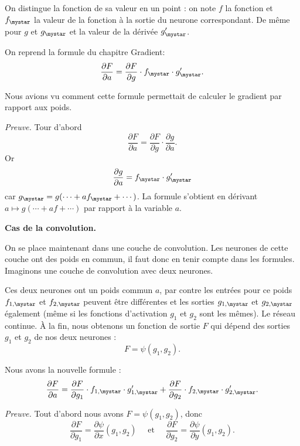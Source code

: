 \documentclass[11pt,class=report,crop=false]{standalone}
\begin{document}
On distingue la fonction de sa valeur en un point : on note $f$ la fonction et $f_\mystar$ la valeur de la fonction à la sortie du neurone correspondant. De même pour $g$ et $g_\mystar$ et la valeur de la dérivée $g'_\mystar$.



On reprend la formule du chapitre \og{}Gradient\fg{}:
$$\frac{\partial F}{\partial a} = \frac{\partial F}{\partial g} \cdot f_\mystar \cdot  g'_\mystar.$$

Nous avions vu comment cette formule permettait de calculer le gradient par rapport aux poids.


\emph{Preuve.}
Tour d'abord $$\frac{\partial F}{\partial a} =  \frac{\partial F}{\partial g} \cdot \frac{\partial g}{\partial a}.$$
Or 
$$\frac{\partial g}{\partial a} = f_\mystar \cdot g'_\mystar$$
car 
$g_\mystar = g(\cdots + a f_\mystar+\cdots)$. La formule s'obtient en dérivant $a \mapsto g(\cdots + a f +\cdots)$ par rapport à la variable $a$.

\textbf{Cas de la convolution.}

On se place maintenant dans une couche de convolution. Les neurones de cette couche ont des poids en commun, il faut donc en tenir compte dans les formules.
Imaginons une couche de convolution avec deux neurones.



Ces deux neurones ont un poids commun $a$, par contre les entrées pour ce poids 
$f_{1,\mystar}$ et $f_{2,\mystar}$ peuvent être différentes et les sorties $g_{1,\mystar}$ et $g_{2,\mystar}$ également (même si les fonctions d'activation $g_1$ et $g_2$ sont les mêmes).
Le réseau continue. À la fin, nous obtenons un fonction de sortie $F$ qui dépend des sorties $g_1$ et $g_2$ de nos deux neurones  :
$$F = \psi(g_1,g_2).$$


Nous avons la nouvelle formule :
$$\frac{\partial F}{\partial a} = \frac{\partial F}{\partial g_1} \cdot f_{1,\mystar} \cdot  g'_{1,\mystar} + \frac{\partial F}{\partial g_2} \cdot f_{2,\mystar} \cdot  g'_{2,\mystar}.$$


\emph{Preuve.}
Tout d'abord nous avons $F = \psi(g_1,g_2)$, donc
$$\frac{\partial F}{\partial g_1} = \frac{\partial \psi}{\partial x}(g_1,g_2)
\quad\text{ et }\quad
\frac{\partial F}{\partial g_2} = \frac{\partial \psi}{\partial y}(g_1,g_2).$$
\end{document}
